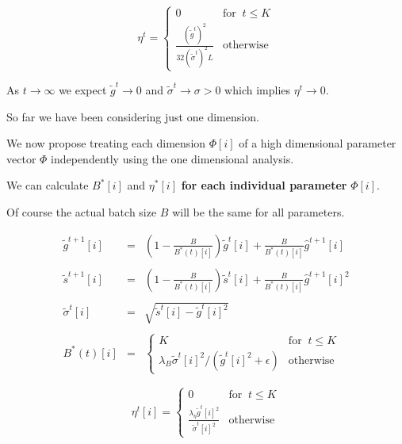 {

$$\eta^t = \left\{\begin{array}{ll} 0 & \mbox{for}\;\;t \leq K \\ \frac{(\tilde{g}^t)^2}{32(\tilde{\sigma}^t)^2L} & \mbox{otherwise}
\end{array}\right.$$

\vfill
As $t \rightarrow \infty$ we expect $\tilde{g}^t \rightarrow 0$ and $\tilde{\sigma}^t \rightarrow \sigma > 0$ which implies
$\eta^t \rightarrow 0$.


So far we have been considering just one dimension.

\vfill
We now propose treating each dimension $\Phi[i]$ of a high dimensional parameter vector $\Phi$ independently using the one dimensional analysis.

\vfill
We can calculate $B^*[i]$ and $\eta^*[i]$ {\bf for each individual parameter} $\Phi[i]$.

\vfill
Of course the actual batch size $B$ will be the same for all parameters.

\begin{eqnarray*}
  \tilde{g}^{t+1}[i] & = & \left(1-\frac{B}{B^*(t)[i]}\right)\tilde{g}^t[i] + \frac{B}{B^*(t)[i]} \hat{g}^{t+1}[i] \\
  \\
  \tilde{s}^{t+1}[i] & = & \left(1-\frac{B}{B^*(t)[i]}\right)\tilde{s}^t[i] + \frac{B}{B^*(t)[i]} \hat{g}^{t+1}[i]^2 \\
  \\
  \tilde{\sigma}^t[i] & = & \sqrt{\tilde{s}^t[i] - \tilde{g}^t[i]^2} \\
  \\
  B^*(t)[i] &= & \left\{\begin{array}{ll} K & \mbox{for}\;\; t \leq K \\
  \lambda_B\tilde{\sigma}^t[i]^2/(\tilde{g}^t[i]^2 + \epsilon) & \mbox{otherwise} \end{array}\right.
\end{eqnarray*}


$$\eta^t[i] = \left\{\begin{array}{ll} 0 & \mbox{for}\;\;t \leq K \\
        \frac{\lambda_\eta\tilde{g}^t[i]^2}{\tilde{\sigma}^t[i]^2} & \mbox{otherwise}
\end{array}\right.$$

}
